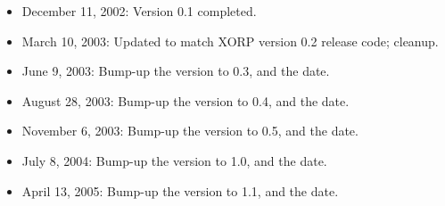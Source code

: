 \documentclass[11pt]{article}
\begin{document}
\begin{itemize}

  \item December 11, 2002: Version 0.1 completed.

  \item March 10, 2003: Updated to match XORP version 0.2 release code;
  cleanup.

  \item June 9, 2003: Bump-up the version to 0.3, and the date.

  \item August 28, 2003: Bump-up the version to 0.4, and the date.

  \item November 6, 2003: Bump-up the version to 0.5, and the date.

  \item July 8, 2004: Bump-up the version to 1.0, and the date.

  \item April 13, 2005: Bump-up the version to 1.1, and the date.

\end{itemize}





\end{document}
